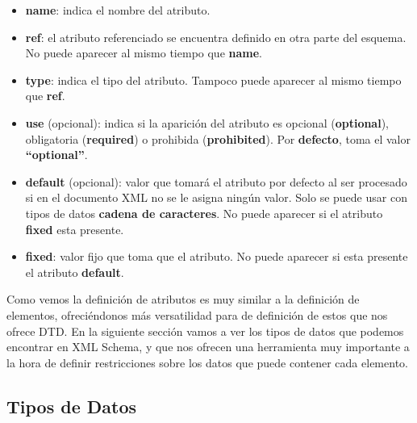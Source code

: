 \begin{itemize}
    \item \textbf{name}: indica el nombre del atributo.
    \item \textbf{ref}: el atributo referenciado se encuentra definido en otra parte del esquema. No puede aparecer al mismo tiempo que \textbf{name}.
    \item \textbf{type}: indica el tipo del atributo. Tampoco puede aparecer al mismo tiempo que \textbf{ref}.
    \item \textbf{use} (opcional): indica si la aparición del atributo es opcional (\textbf{optional}), obligatoria (\textbf{required}) o prohibida (\textbf{prohibited}). Por \textbf{defecto}, toma el valor \textbf{``optional''}.
    \item \textbf{default} (opcional): valor que tomará el atributo por defecto al ser procesado si en el documento XML no se le asigna ningún valor. Solo se puede usar con tipos de datos \textbf{cadena de caracteres}. No puede aparecer si el atributo \textbf{fixed} esta presente.
    \item \textbf{fixed}: valor fijo que toma que el atributo. No puede aparecer si esta presente el atributo \textbf{default}.
\end{itemize}

Como vemos la definición de atributos es muy similar a la definición de elementos, ofreciéndonos más versatilidad para de definición de estos que nos ofrece DTD. En la siguiente sección vamos a ver los tipos de datos que podemos encontrar en XML Schema, y que nos ofrecen una herramienta muy importante a la hora de definir restricciones sobre los datos que puede contener cada elemento.

\subsection{Tipos de Datos}


\glsaddall
\printglossaries


\newpage
{}



